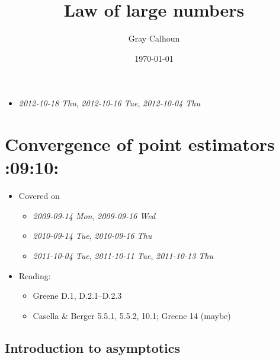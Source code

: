 \documentclass[11pt]{article}
\title{Law of large numbers}
\author{Gray Calhoun}
\date{\today}
\begin{document}
\maketitle

\setcounter{tocdepth}{2}
\tableofcontents
\vspace*{1cm}
\begin{itemize}
\item \textit{2012-10-18 Thu}, \textit{2012-10-16 Tue}, \textit{2012-10-04 Thu}
\end{itemize}
\section{Convergence of point estimators \textbf{:09:10:}}
\label{sec-1}

\begin{itemize}
\item Covered on
\begin{itemize}
\item \textit{2009-09-14 Mon}, \textit{2009-09-16 Wed}
\item \textit{2010-09-14 Tue}, \textit{2010-09-16 Thu}
\item \textit{2011-10-04 Tue}, \textit{2011-10-11 Tue}, \textit{2011-10-13 Thu}
\end{itemize}
\item Reading:
\begin{itemize}
\item Greene D.1, D.2.1--D.2.3
\item Casella \& Berger 5.5.1, 5.5.2, 10.1; Greene 14 (maybe)
\end{itemize}
\end{itemize}
\subsection{Introduction to asymptotics}
\label{sec-1-1}
\end{document}
